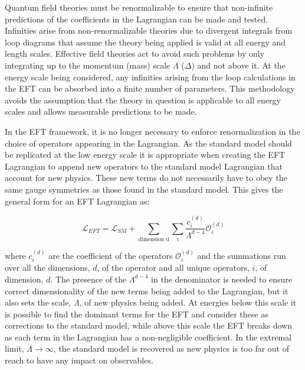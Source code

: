 Quantum field theories must be renormalizable to ensure that non-infinite predictions of the coefficients in the Lagrangian can be made and tested.  Infinities arise from non-renormalizable theories due to divergent integrals from loop diagrams that assume the theory being applied is valid at all energy and length scales.  Effective field theories act to avoid such problems by only integrating up to the momentum (mass) scale $\Lambda$ ($\Delta$) and not above it.  At the energy scale being considered, any infinities arising from the loop calculations in the EFT can be absorbed into a finite number of parameters.  This methodology avoids the assumption that the theory in question is applicable to all energy scales and allows measurable predictions to be made.  

In the EFT framework, it is no longer necessary to enforce renormalization in the choice of operators appearing in the Lagrangian.  As the standard model should be replicated at the low energy scale it is appropriate when creating the EFT Lagrangian to append new operators to the standard model Lagrangian that account for new physics.  These new terms do not necessarily have to obey the same gauge symmetries as those found in the standard model.  This gives the general form for an EFT Lagrangian as:

\begin{equation}
\mathcal{L}_{EFT} = \mathcal{L}_{SM} + \sum_{\text{dimension d}} \sum_{i} \frac{c_{i}^{(d)}}{\Lambda^{d-4}} \mathcal{O}_{i}^{(d)}
\end{equation}

where $c_{i}^{(d)}$ are the coefficient of the operators $\mathcal{O}_{i}^{(d)}$ and the summations run over all the dimensions, $d$, of the operator and all unique operators, $i$, of dimension, $d$.  The presence of the $\Lambda^{d-4}$ in the denominator is needed to ensure correct dimensionality of the new terms being added to the Lagrangian, but it also sets the scale, $\Lambda$, of new physics being added.  At energies below this scale it is possible to find the dominant terms for the EFT and consider these as corrections to the standard model, while above this scale the EFT breaks down as each term in the Lagrangian has a non-negligible coefficient.  In the extremal limit, $\Lambda \rightarrow \infty$, the standard model is recovered as new physics is too far out of reach to have any impact on observables.


